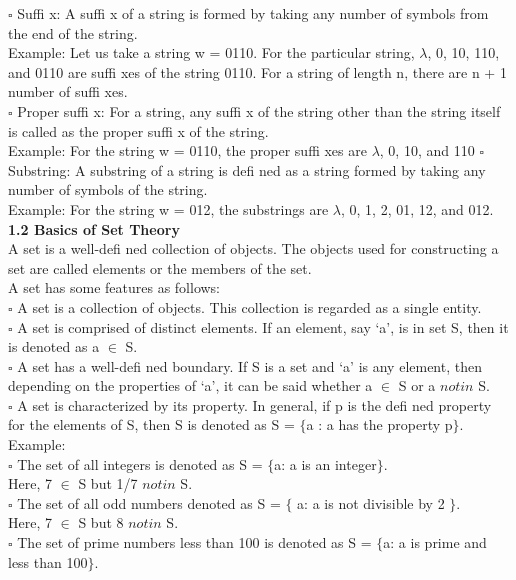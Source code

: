 \documentclass[12pt,a4paper]{book}
\begin{document}
$\square$ Suffi x: A suffi x of a string is formed by taking any number of symbols from the end of the string.\\
Example: Let us take a string w = 0110. For the particular string, $\lambda$, 0, 10, 110, and 0110 are suffi
xes of the string 0110. For a string of length n, there are n + 1 number of suffi xes.\\
$\square$ Proper suffi x: For a string, any suffi x of the string other than the string itself is called as the proper
suffi x of the string.\\
Example: For the string w = 0110, the proper suffi xes are $\lambda$, 0, 10, and 110
\newpage
$\square$ Substring: A substring of a string is defi ned as a string formed by taking any number of symbols
of the string.\\
Example: For the string w = 012, the substrings are $\lambda$, 0, 1, 2, 01, 12, and 012.\\
\textbf{1.2 Basics of Set Theory} \\
A set is a well-defi ned collection of objects. The objects used for constructing a set are called elements
or the members of the set.\\
A set has some features as follows:\\
$\square$ A set is a collection of objects. This collection is regarded as a single entity.\\
$\square$ A set is comprised of distinct elements. If an element, say ‘a’, is in set S, then it is denoted as a $\in$ S.\\
$\square$ A set has a well-defi ned boundary. If S is a set and ‘a’ is any element, then depending on the
properties of ‘a’, it can be said whether a $\in$ S or a $notin$ S.\\
$\square$ A set is characterized by its property. In general, if p is the defi ned property for the elements of S,
then S is denoted as S = $\{$a : a has the property p$\}$.\\
Example:\\
$\square$ The set of all integers is denoted as S = $\{$a: a is an integer$\}$.\\
Here, 7 $\in$ S but 1/7 $notin$ S.\\
$\square$ The set of all odd numbers denoted as S = $\{$ a: a is not divisible by 2 $\}$.\\
Here, 7 $\in$ S but 8 $notin$ S.\\
$\square$ The set of prime numbers less than 100 is denoted as S = $\{$a: a is prime and less than 100$\}$.\\
\end{document}
